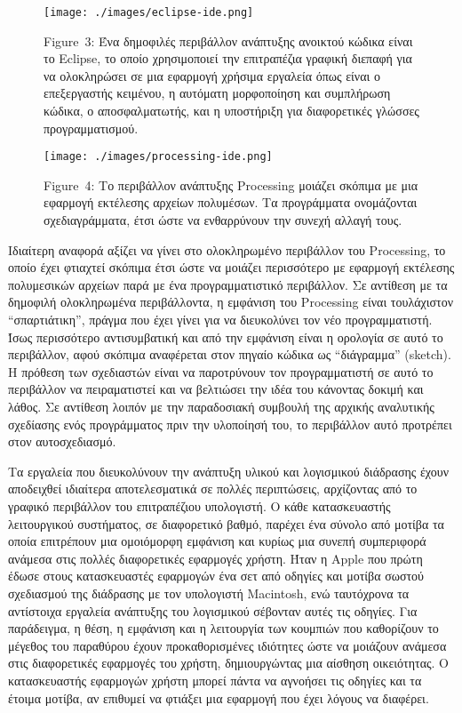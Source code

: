 \documentclass[
]{article}
\begin{document}
\leavevmode{}%
\begin{figure}
\hypertarget{fig:eclipse-ide}{%
\centering
\texttt{[image: ./images/eclipse-ide.png]}
\caption{Figure~3: Ένα δημοφιλές περιβάλλον ανάπτυξης ανοικτού κώδικα
είναι το Eclipse, το οποίο χρησιμοποιεί την επιτραπέζια γραφική διεπαφή
για να ολοκληρώσει σε μια εφαρμογή χρήσιμα εργαλεία όπως είναι ο
επεξεργαστής κειμένου, η αυτόματη μορφοποίηση και συμπλήρωση κώδικα, ο
αποσφαλματωτής, και η υποστήριξη για διαφορετικές γλώσσες
προγραμματισμού.}\label{fig:eclipse-ide}
}
\end{figure}

\leavevmode{}%
\begin{figure}
\hypertarget{fig:processing-ide}{%
\centering
\texttt{[image: ./images/processing-ide.png]}
\caption{Figure~4: Το περιβάλλον ανάπτυξης Processing μοιάζει σκόπιμα με
μια εφαρμογή εκτέλεσης αρχείων πολυμέσων. Τα προγράμματα ονομάζονται
σχεδιαγράμματα, έτσι ώστε να ενθαρρύνουν την συνεχή αλλαγή
τους.}\label{fig:processing-ide}
}
\end{figure}

Ιδιαίτερη αναφορά αξίζει να γίνει στο ολοκληρωμένο περιβάλλον του
Processing, το οποίο έχει φτιαχτεί σκόπιμα έτσι ώστε να μοιάζει
περισσότερο με εφαρμογή εκτέλεσης πολυμεσικών αρχείων παρά με ένα
προγραμματιστικό περιβάλλον. Σε αντίθεση με τα δημοφιλή ολοκληρωμένα
περιβάλλοντα, η εμφάνιση του Processing είναι τουλάχιστον
``σπαρτιάτικη'', πράγμα που έχει γίνει για να διευκολύνει τον νέο
προγραμματιστή. Ίσως περισσότερο αντισυμβατική και από την εμφάνιση
είναι η ορολογία σε αυτό το περιβάλλον, αφού σκόπιμα αναφέρεται στον
πηγαίο κώδικα ως ``διάγραμμα'' (sketch). Η πρόθεση των σχεδιαστών είναι
να παροτρύνουν τον προγραμματιστή σε αυτό το περιβάλλον να πειραματιστεί
και να βελτιώσει την ιδέα του κάνοντας δοκιμή και λάθος. Σε αντίθεση
λοιπόν με την παραδοσιακή συμβουλή της αρχικής αναλυτικής σχεδίασης ενός
προγράμματος πριν την υλοποίησή του, το περιβάλλον αυτό προτρέπει στον
αυτοσχεδιασμό.

Τα εργαλεία που διευκολύνουν την ανάπτυξη υλικού και λογισμικού
διάδρασης έχουν αποδειχθεί ιδιαίτερα αποτελεσματικά σε πολλές
περιπτώσεις, αρχίζοντας από το γραφικό περιβάλλον του επιτραπέζιου
υπολογιστή. Ο κάθε κατασκευαστής λειτουργικού συστήματος, σε διαφορετικό
βαθμό, παρέχει ένα σύνολο από μοτίβα τα οποία επιτρέπουν μια ομοιόμορφη
εμφάνιση και κυρίως μια συνεπή συμπεριφορά ανάμεσα στις πολλές
διαφορετικές εφαρμογές χρήστη. Ήταν η Apple που πρώτη έδωσε στους
κατασκευαστές εφαρμογών ένα σετ από οδηγίες και μοτίβα σωστού σχεδιασμού
της διάδρασης με τον υπολογιστή Macintosh, ενώ ταυτόχρονα τα αντίστοιχα
εργαλεία ανάπτυξης του λογισμικού σέβονταν αυτές τις οδηγίες. Για
παράδειγμα, η θέση, η εμφάνιση και η λειτουργία των κουμπιών που
καθορίζουν το μέγεθος του παραθύρου έχουν προκαθορισμένες ιδιότητες ώστε
να μοιάζουν ανάμεσα στις διαφορετικές εφαρμογές του χρήστη,
δημιουργώντας μια αίσθηση οικειότητας. Ο κατασκευαστής εφαρμογών χρήστη
μπορεί πάντα να αγνοήσει τις οδηγίες και τα έτοιμα μοτίβα, αν επιθυμεί
να φτιάξει μια εφαρμογή που έχει λόγους να διαφέρει.
\end{document}
